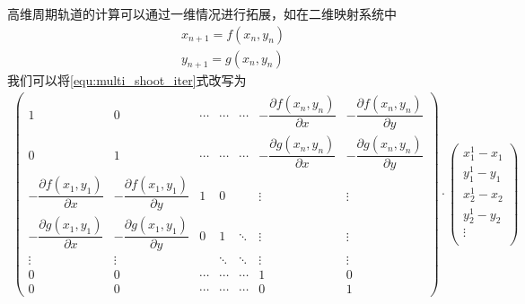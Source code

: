 高维周期轨道的计算可以通过一维情况进行拓展，如在二维映射系统中
\begin{equation}
    \begin{aligned}
        x_{n+1}=f(x_n,y_n)\\
        y_{n+1}=g(x_n,y_n)
    \end{aligned}
\end{equation}
我们可以将\eqref{equ:multi_shoot_iter}式改写为
\begin{equation}
    \begin{aligned}
        \begin{pmatrix}
            1            & 0            & \cdots & \cdots & \cdots & -\dfrac{\partial f(x_{n},y_{n})}{\partial x} & -\dfrac{\partial f(x_{n},y_{n})}{\partial y} \\
            0            & 1            & \cdots & \cdots & \cdots & -\dfrac{\partial g(x_{n},y_{n})}{\partial x} & -\dfrac{\partial g(x_{n},y_{n})}{\partial y} \\
            -\dfrac{\partial f(x_{1},y_{1})}{\partial x} & -\dfrac{\partial f(x_{1},y_{1})}{\partial y} & 1      & 0      &        & \vdots       & \vdots       \\
            -\dfrac{\partial g(x_{1},y_{1})}{\partial x} & -\dfrac{\partial g(x_{1},y_{1})}{\partial y} & 0      & 1      & \ddots & \vdots       & \vdots       \\
            \vdots       & \vdots       &        & \ddots & \ddots & \vdots       & \vdots       \\
            0            & 0            & \cdots & \cdots & \cdots & 1            & 0            \\
            0            & 0            & \cdots & \cdots & \cdots & 0            & 1 
        \end{pmatrix}\cdot
        \begin{pmatrix}
            x_{1}^{1}-x_{1}\\
            y_{1}^{1}-y_{1}\\
            x_{2}^{1}-x_{2}\\
            y_{2}^{1}-y_{2}\\
            \vdots\\

\end{pmatrix}
\end{aligned}
\end{equation}
